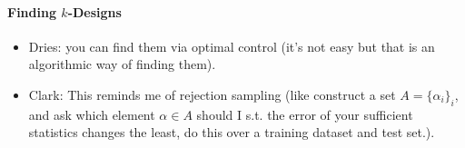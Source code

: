 \documentclass{article}
\begin{document}
\paragraph{Finding $k$-Designs}
\begin{itemize}
	\item Dries: you can find them via optimal control (it's not easy but that is an algorithmic way of finding them).
	\item  Clark: This reminds me of rejection sampling (like construct a set $A = \{\alpha_i\}_i$, and ask which element $\alpha \in A$ should I s.t. the error of your sufficient statistics changes the least, do this over a training dataset and test set.).
\end{itemize}



\newpage


\end{document}
